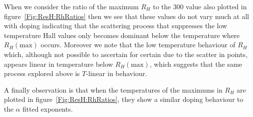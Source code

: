 When we consider the ratio of the maximum $R_H$ to the \unit{300}{\kelvin} value also plotted in figure~\ref{Fig:ResH:RhRatios} then we see that these values do not vary much at all with doping indicating that the scattering process that suppresses the low temperature Hall values only becomes dominant below the temperature where $R_H(\textrm{max})$ occurs. Moreover we note that the low temperature behaviour of $R_H$ which, although not possible to ascertain for certain due to the scatter in points, appears linear in temperature below $R_H(\textrm{max})$, which suggests that the same process explored above is $T$-linear in behaviour.

A finally observation is that when the temperatures of the maximums in $R_H$ are plotted in figure~\ref{Fig:ResH:RhRatios}, they show a similar doping behaviour to the $\alpha$ fitted exponents.








